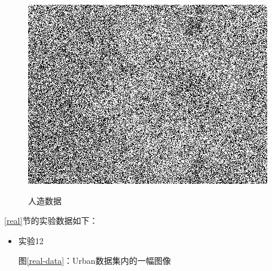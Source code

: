 \documentclass[12pt, a4paper]{article}
\begin{document}
\begin{figure}[h]
{	\includegraphics[scale=0.25]{exp-10.jpg}
	\label{syn-data-10}
}

\caption{人造数据}
\label{syn-data}
\end{figure}
	
\par \ref{real}节的实验数据如下：
\begin{itemize}
\item 实验12
\par 图\ref{real-data}：Urban数据集内的一幅图像
\end{itemize}
\end{document}
